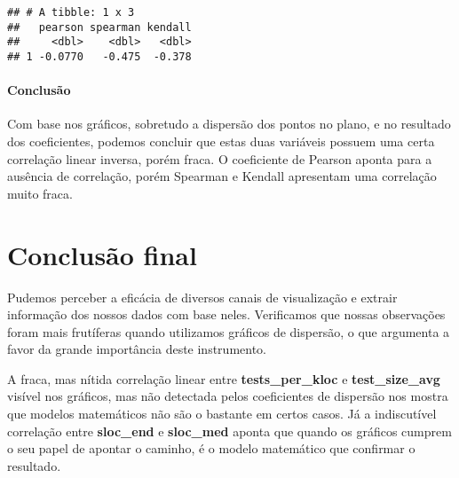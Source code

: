\documentclass[]{article}
\let\oldparagraph\paragraph
\renewcommand{\paragraph}[1]{\oldparagraph{#1}\mbox{}}
\begin{document}
\begin{verbatim}
## # A tibble: 1 x 3
##   pearson spearman kendall
##     <dbl>    <dbl>   <dbl>
## 1 -0.0770   -0.475  -0.378
\end{verbatim}

\paragraph{Conclusão}\label{conclusao-1}

Com base nos gráficos, sobretudo a dispersão dos pontos no plano, e no
resultado dos coeficientes, podemos concluir que estas duas variáveis
possuem uma certa correlação linear inversa, porém fraca. O coeficiente
de Pearson aponta para a ausência de correlação, porém Spearman e
Kendall apresentam uma correlação muito fraca.

\section{Conclusão final}\label{conclusao-final}

Pudemos perceber a eficácia de diversos canais de visualização e extrair
informação dos nossos dados com base neles. Verificamos que nossas
observações foram mais frutíferas quando utilizamos gráficos de
dispersão, o que argumenta a favor da grande importância deste
instrumento.

A fraca, mas nítida correlação linear entre \textbf{tests\_per\_kloc} e
\textbf{test\_size\_avg} visível nos gráficos, mas não detectada pelos
coeficientes de dispersão nos mostra que modelos matemáticos não são o
bastante em certos casos. Já a indiscutível correlação entre
\textbf{sloc\_end} e \textbf{sloc\_med} aponta que quando os gráficos
cumprem o seu papel de apontar o caminho, é o modelo matemático que
confirmar o resultado.
\end{document}
